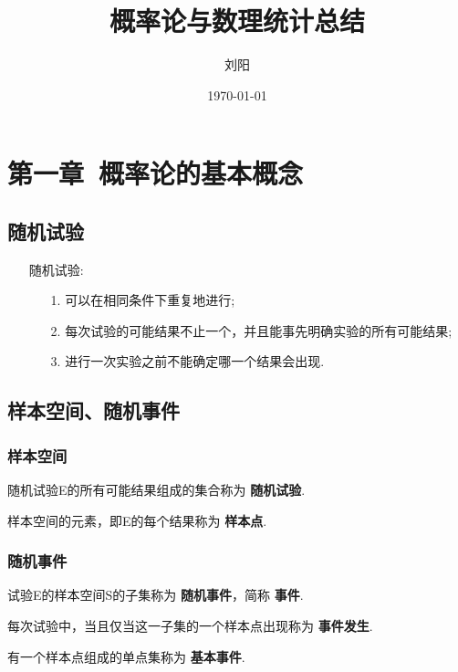 \documentclass[UTF8]{ctexart}
\begin{document}
	\title{概率论与数理统计总结}
	\author{刘阳}
	\date{\today}
	\maketitle
	
	\tableofcontents
	
	\section{第一章\ 概率论的基本概念}
	
	\subsection{随机试验}
	
	\begin{itemize}
		\item [随机试验:] {
			\begin{enumerate}
				\item [1.] {可以在相同条件下重复地进行;}
				\item [2.] {每次试验的可能结果不止一个，并且能事先明确实验的所有可能结果;}
				\item [3.] {进行一次实验之前不能确定哪一个结果会出现.}
			\end{enumerate}
		}
	\end{itemize}

	\subsection{样本空间、随机事件}
	
	\subsubsection{样本空间}
	
	{随机试验E的所有可能结果组成的集合称为 \textbf{随机试验}.}
	
	{样本空间的元素，即E的每个结果称为 \textbf{样本点}.}
	\subsubsection{随机事件}
	
	{试验E的样本空间S的子集称为 \textbf{随机事件}，简称 \textbf{事件}.}
	
	{每次试验中，当且仅当这一子集的一个样本点出现称为 \textbf{事件发生}.}
	
	{有一个样本点组成的单点集称为 \textbf{基本事件}.}
	
\end{document}
